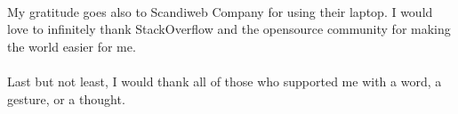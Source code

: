 \paragraph{}
My gratitude goes also to Scandiweb Company for using their laptop. I would love to infinitely thank StackOverflow and the opensource community for making the world easier for me.
\paragraph{}
Last but not least, I would thank all of those who supported me with a word, a gesture, or a thought.